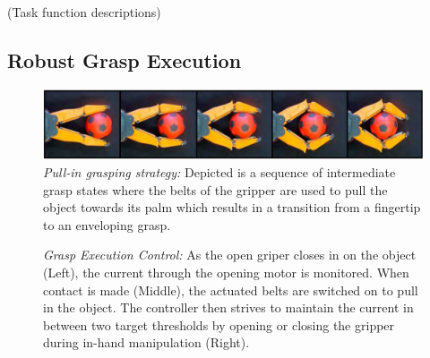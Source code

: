 \cite{Kano09}(Task function descriptions)
%
\subsection{Robust Grasp Execution}
\label{subsec:grasp_execution}
%


\begin{figure}[!t]
 \centering
   \includegraphics[width = 1.0\linewidth]{figs/pull_in}
   \caption{\textit{Pull-in grasping strategy:} Depicted is a sequence of intermediate grasp states
     where the belts of the gripper are used to pull the object towards its palm which results in a
     transition from a fingertip to an enveloping grasp.}
   \vspace{-4mm}
   \label{fig:pull_in}
   \centering
 \end{figure}
%
\begin{figure}[!t]
 \centering
   \caption{\textit{Grasp Execution Control:} As the open griper closes in on the object (Left), the
     current through the opening motor is monitored. When contact is made (Middle), the actuated
     belts are switched on to pull in the object. The controller then strives to maintain the
     current in between two target thresholds by opening or closing the gripper during in-hand
     manipulation (Right).}
   \label{fig:pull_in_control}
 \centering
\end{figure}
